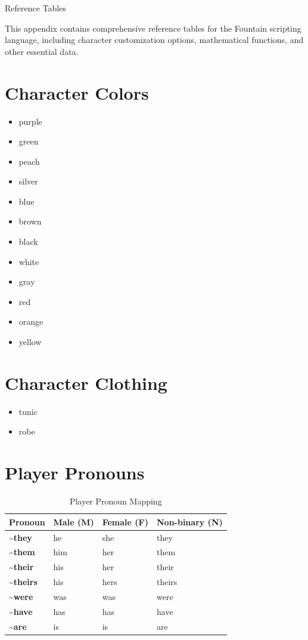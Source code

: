 \documentclass[11pt,letterpaper,oldstylefigures]{memoir}
\makeatletter
\let\oldchapter\chapter
\def\chapter{%
  \@ifstar
    {\FountainScripting@starchapter}%
    {\@dblarg\FountainScripting@chapter}}
\def\FountainScripting@starchapter#1{\oldchapter*{#1}\chaptermark{#1}}
\def\FountainScripting@chapter[#1]#2{\oldchapter[#1]{#2}\chaptermark{#2}}
\newcommand{\fountain}[1]{\textbf{#1}}
\makeatother
\begin{document}
\chapter{Reference Tables}
\label{app:reference-tables}

This appendix contains comprehensive reference tables for the Fountain scripting language, including character customization options, mathematical functions, and other essential data.

\section{Character Colors}
\begin{itemize}
\item purple
\item green
\item peach
\item silver
\item blue
\item brown
\item black
\item white
\item gray
\item red
\item orange
\item yellow
\end{itemize}
\section{Character Clothing}
\begin{itemize}
\item tunic
\item robe
\end{itemize}

\section{Player Pronouns}
\begin{table}[h]
\centering
\renewcommand{\arraystretch}{1.3}
\setlength{\tabcolsep}{12pt}
\begin{tabular}{|l|l|l|l|}
\hline
\textbf{Pronoun} & \textbf{Male (M)} & \textbf{Female (F)} & \textbf{Non-binary (N)} \\
\hline\hline
\fountain{\textasciitilde{}they} & he & she & they \\
\fountain{\textasciitilde{}them} & him & her & them \\
\fountain{\textasciitilde{}their} & his & her & their \\
\fountain{\textasciitilde{}theirs} & his & hers & theirs \\
\fountain{\textasciitilde{}were} & was & was & were \\
\fountain{\textasciitilde{}have} & has & has & have \\
\fountain{\textasciitilde{}are} & is & is & are \\
\hline
\end{tabular}
\caption{Player Pronoun Mapping}
\end{table}
\end{document}
